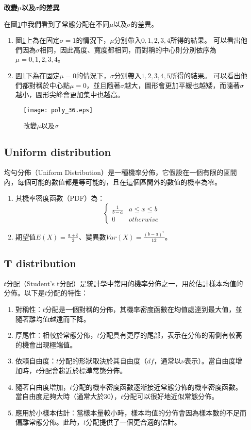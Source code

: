 \documentclass[12pt, a4paper]{article}
\begin{document}
\textbf{改變\;$\mu$\;以及\;$\sigma$\;的差異}

在圖\;\ref{fig:poly_36.eps}\;中我們看到了常態分配在不同\;$\mu$\;以及\;$\sigma$\;的差異。
\begin{enumerate}
\item 圖\;\ref{fig:poly_36.eps}\;上為在固定\;$\sigma =1$\;的情況下，\;$\mu$\;分別帶入\;$0,1,2,3,4$\;所得的結果。
可以看出他們因為\;$\sigma$\;相同，因此高度、寬度都相同，而對稱的中心則分別依序為\;$\mu=0,1,2,3,4$\;。
\item 圖\;\ref{fig:poly_36.eps}\;下為在固定\;$\mu=0$\;的情況下，\;$\sigma$\;分別帶入\;$1,2,3,4,5$\;所得的結果。
可以看出他們都對稱於中心點\;$\mu=0$\;，並且隨著\;$\sigma$\;越大，圖形會更加平緩也越矮，而隨著\;$\sigma$\;越小，圖形尖峰會更加集中也越高。
\end{enumerate}

\begin{figure}[h]
\centering
\texttt{[image: poly\_36.eps]}
\caption{改變\;$\mu$\;以及\;$\sigma$\;}
\label{fig:poly_36.eps}
\end{figure}

\subsection{Uniform distribution}
均勻分佈（Uniform Distribution）是一種機率分佈，它假設在一個有限的區間內，每個可能的數值都是等可能的，且在這個區間外的數值的機率為零。
\begin{enumerate}
\item 其機率密度函數（PDF）為\;：
$$\begin{cases}\frac{1}{b-a} & a \leq x \leq b\\0 & otherwise\end{cases}$$

\item 期望值\;$E(X)= \frac{a+b}{2}$\;、變異數\;$Var(X)=\frac{(b-a)^2}{12}$\;。
\end{enumerate}

\subsection{T distribution}
$t$\;分配（Student's t分配）是統計學中常用的機率分佈之一，用於估計樣本均值的分佈。以下是\;$t$\;分配的特性：
\begin{enumerate}
\item 對稱性：\;$t$\;分配是一個對稱的分佈，其機率密度函數在均值處達到最大值，並隨著離均值越遠而下降。
\item 厚尾性：相較於常態分佈，\;$t$\;分配具有更厚的尾部，表示在分佈的兩側有較高的機會出現極端值。
\item 依賴自由度：\;$t$\;分配的形狀取決於其自由度（\;$df$\;，通常以\;$\nu$\;表示）。當自由度增加時，\;$t$\;分配會趨近於標準常態分佈。
\item 隨著自由度增加，\;$t$\;分配的機率密度函數逐漸接近常態分佈的機率密度函數。當自由度足夠大時（通常大於\;$30$\;），\;$t$\;分配可以很好地近似常態分佈。
\item 應用於小樣本估計：當樣本量較小時，樣本均值的分佈會因為樣本數的不足而偏離常態分佈。此時，\;$t$\;分配提供了一個更合適的估計。
\end{enumerate}
\end{document}
